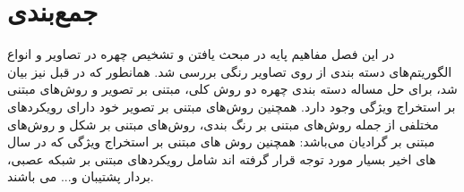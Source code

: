 \section{جمع‌بندی}
در این فصل مفاهیم‌ پایه در مبحث یافتن و تشخیص چهره در تصاویر و انواع الگوریتم‌های دسته ‌بندی از روی تصاویر رنگی بررسی شد. همانطور که در قبل نیز بیان شد، برای حل مساله دسته ‌بندی چهره دو روش کلی، مبتنی بر تصویر و روش‌های مبتنی بر استخراج ویژگی وجود دارد. همچنین روش‌های مبتنی بر تصویر خود دارای رویکردهای مختلفی از جمله روش‌های مبتنی بر رنگ‌ بندی، روش‌های مبتنی بر شکل و روش‌های مبتنی بر گرادیان می‌باشد: همچنین روش های مبتنی بر استخراج ویژگی که در سال های اخیر بسیار مورد توجه قرار گرفته اند شامل رویکردهای مبتنی بر شبکه عصبی، بردار پشتیبان و... می باشند.
